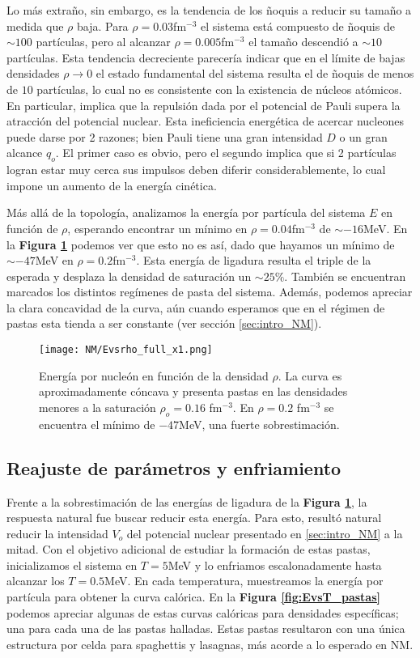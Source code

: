 Lo más extraño, sin embargo, es la tendencia de los ñoquis a reducir su tamaño a medida que $\rho$ baja. 
Para $\rho=0.03$fm$^{-3}$ el sistema está compuesto de ñoquis de $\sim 100$ partículas, pero al alcanzar $\rho=0.005$fm$^{-3}$ el tamaño descendió a $\sim 10$ partículas.
Esta tendencia decreciente parecería indicar que en el límite de bajas densidades $\rho\to0$ el estado fundamental del sistema resulta el de ñoquis de menos de $10$ partículas, 
lo cual no es consistente con la existencia de núcleos atómicos. 
En particular, implica que la repulsión dada por el potencial de Pauli supera la atracción del potencial nuclear.
Esta ineficiencia energética de acercar nucleones puede darse por 2 razones; bien Pauli tiene una gran intensidad $D$ o un gran alcance $q_o$. 
El primer caso es obvio, pero el segundo implica que si 2 partículas logran estar muy cerca sus impulsos deben diferir considerablemente, lo cual impone un aumento de la energía cinética.

Más allá de la topología, analizamos la energía por partícula del sistema $E$ en función de $\rho$, esperando encontrar un mínimo en $\rho=0.04$fm$^{-3}$ de $\sim -16$MeV.
En la \textbf{Figura \ref{fig:Evsrho_QCNMx1}} podemos ver que esto no es así, dado que hayamos un mínimo de $\sim -47$MeV en $\rho=0.2$fm$^{-3}$.
Esta energía de ligadura resulta el triple de la esperada y desplaza la densidad de saturación un $\sim 25\%$. 
También se encuentran marcados los distintos regímenes de pasta del sistema. 
Además, podemos apreciar la clara concavidad de la curva, aún cuando esperamos que en el régimen de pastas esta tienda a ser constante (ver sección \ref{sec:intro_NM}).

\begin{figure}[H]
	\centering
	\texttt{[image: NM/Evsrho\_full\_x1.png]}
	\caption{Energía por nucleón en función de la densidad $\rho$. 
		La curva es aproximadamente cóncava y presenta pastas en las densidades menores a la saturación $\rho_o=0.16$ fm$^{-3}$. 
		En $\rho=0.2$ fm$^{-3}$ se encuentra el mínimo de $-47$MeV, una fuerte sobrestimación. }
	\label{fig:Evsrho_QCNMx1}
\end{figure}

\subsection{Reajuste de parámetros y enfriamiento}

Frente a la sobrestimación de las energías de ligadura de la \textbf{Figura \ref{fig:Evsrho_QCNMx1}}, la respuesta natural fue buscar reducir esta energía.
Para esto, resultó natural reducir la intensidad $V_o$ del potencial nuclear presentado en \ref{sec:intro_NM} a la mitad.
Con el objetivo adicional de estudiar la formación de estas pastas, inicializamos el sistema en $T=5$MeV y lo enfriamos escalonadamente hasta alcanzar los $T=0.5$MeV.
En cada temperatura, muestreamos la energía por partícula para obtener la curva calórica.
En la \textbf{Figura \ref{fig:EvsT_pastas}} podemos apreciar algunas de estas curvas calóricas para densidades específicas; una para cada una de las pastas halladas.
Estas pastas resultaron con una única estructura por celda para spaghettis y lasagnas, más acorde a lo esperado en NM.

